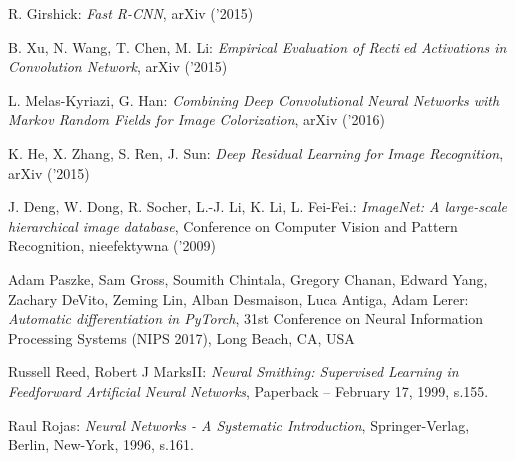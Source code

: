 \begin{thebibliography}{99}
   R. Girshick:
  \emph{Fast R-CNN},
  arXiv ('2015)

   B. Xu, N. Wang, T. Chen, M. Li:
  \emph{Empirical Evaluation of Rectied Activations in Convolution Network},
   arXiv ('2015)

    L. Melas-Kyriazi, G. Han:
   \emph{Combining Deep Convolutional Neural Networks with Markov Random
   Fields for Image Colorization}, arXiv ('2016)

    K. He, X. Zhang, S. Ren, J. Sun:
   \emph{Deep Residual Learning for Image Recognition}, arXiv ('2015)

   J. Deng, W. Dong, R. Socher, L.-J. Li, K. Li, L. Fei-Fei.:
   \emph{ImageNet: A large-scale hierarchical image database}, Conference on Computer Vision and Pattern Recognition, nieefektywna ('2009)

   Adam Paszke, Sam Gross, Soumith Chintala, Gregory Chanan,
   Edward Yang, Zachary DeVito, Zeming Lin, Alban Desmaison, Luca Antiga, Adam Lerer:
   \emph{Automatic differentiation in PyTorch}, 31st Conference on Neural Information
   Processing Systems (NIPS 2017), Long Beach, CA, USA

    Russell Reed,  Robert J MarksII:
  \emph{Neural Smithing: Supervised Learning in Feedforward Artificial Neural Networks},
  Paperback – February 17, 1999, s.155.

   Raul Rojas:
  \emph{Neural Networks - A Systematic Introduction},
  Springer-Verlag, Berlin, New-York, 1996, s.161.


\end{thebibliography}
